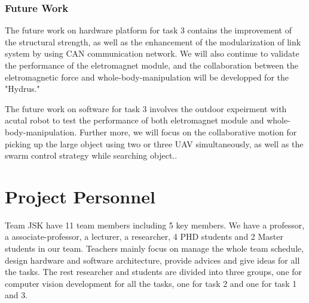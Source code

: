 \documentclass{standalone}
\begin{document}
\subsubsection{Future Work}
The future work on hardware platform for task 3 contains the improvement of the structural strength, as well as the enhancement of the modularization of link system by using CAN communication network. We will also continue to validate the performance of the eletromagnet module, and the  collaboration between the eletromagnetic force and whole-body-manipulation will be developped for the "Hydrus."

The future work on software for task 3 involves the outdoor expeirment with acutal robot to test the performance of both eletromagnet module and whole-body-manipulation. Further more, we will focus on the collaborative motion for picking up the large object using two or three UAV simultaneously, as well as the swarm control strategy while searching object..

\section{Project Personnel}
Team JSK have 11 team members including 5 key members. We have a professor, a associate-professor, a lecturer, a researcher, 4 PHD students and 2 Master students in our team. Teachers mainly focus on manage the whole team schedule, design hardware and software architecture, provide advices and give ideas for all the tasks. The rest researcher and students are divided into three groups, one for computer vision development for all the tasks, one for task 2 and one for task 1 and 3.
\end{document}

